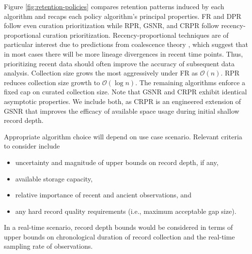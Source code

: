 Figure \ref{fig:retention-policies} compares retention patterns induced by each algorithm and recaps each policy algorithm's principal properties.
FR and DPR follow even curation prioritization while RPR, GSNR, and CRPR follow recency-proportional curation prioritization.
Recency-proportional techniques are of particular interest due to predictions from coalescence theory \citep{nordborgCoalescentTheory2019, berestyckiRecentProgressCoalescent2009}, which suggest that in most cases there will be more lineage divergences in recent time points.
Thus, prioritizing recent data should often improve the accuracy of subsequent data analysis. 
Collection size grows the most aggressively under FR as $\mathcal{O}(n)$.
RPR reduces collection size growth to $\mathcal{O}(\log n)$.
The remaining algorithms enforce a fixed cap on curated collection size.
Note that GSNR and CRPR exhibit identical asymptotic properties.
We include both, as CRPR is an engineered extension of GSNR that improves the efficacy of available space usage during initial shallow record depth.

Appropriate algorithm choice will depend on use case scenario.
Relevant criteria to consider include
\begin{itemize}
  \item uncertainty and magnitude of upper bounds on record depth, if any,
  \item available storage capacity,
  \item relative importance of recent and ancient observations, and
  \item any hard record quality requirements (i.e., maximum acceptable gap size).
\end{itemize}

In a real-time scenario, record depth bounds would be considered in terms of upper bounds on chronological duration of record collection and the real-time sampling rate of observations.










